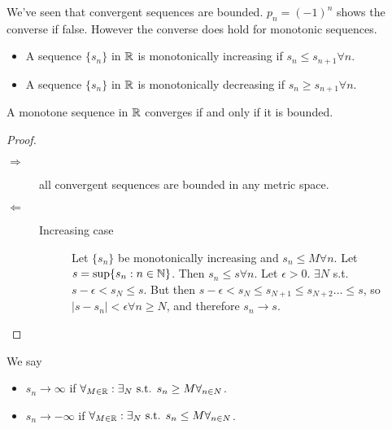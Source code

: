 We've seen that convergent sequences are bounded. $p_{n}=(-1)^{n}$ shows the converse if false.
However the converse does hold for monotonic sequences.
\begin{definition}[Monotone]
	\begin{itemize}
		\item
		      A sequence $\{s_n\}$ in $\mathbb{R}$ is monotonically increasing if $s_{n}\le s_{n+1} \forall n$.
		\item A sequence $\{s_n\}$ in $\mathbb{R}$ is monotonically decreasing if $s_{n}\ge s_{n+1} \forall n$.
	\end{itemize}
\end{definition}

\begin{theorem}
	\label{thm:3.14}
	A monotone sequence in $\mathbb{R}$ converges if and only if it is bounded.
	\begin{proof}
		\begin{description}
			\item[$\Rightarrow$] all convergent sequences are bounded in any metric space.
			\item [$\Leftarrow$]
			      \begin{description}
				      \item[Increasing case]
				            Let $\{s_n\}$ be monotonically increasing and $s_n \le M \forall n$.
				            Let $s=\sup \{ s_n:n \in \mathbb{N}\}$. Then $s_{n} \le s \forall n$. Let $\epsilon>0$. $\exists N $ s.t. $s-\epsilon<s_N\le s$.
				            But then $s-\epsilon<s_N\le s_{N+1}\le s_{N+2}\ldots \le s$, so $|s-s_n|<\epsilon \forall n\ge N$, and therefore $s_{n}\to s$.
			      \end{description}
		\end{description}
	\end{proof}
\end{theorem}


\begin{definition}
	\label{def:3.15}
	We say
	\begin{itemize}
		\item
		      $s_{n}\to \infty $ if $\forall_{M \in \mathbb{R}}: \exists_{N} \text{ s.t. } s_n\ge M \forall_{n \in N}$.

		\item $s_{n}\to -\infty $ if $\forall_{M \in \mathbb{R}}: \exists_{N} \text{ s.t. } s_n\le M \forall_{n \in N}$.
	\end{itemize}
\end{definition}

